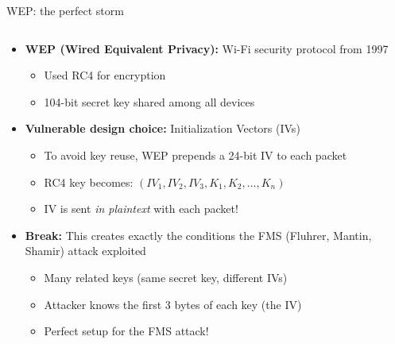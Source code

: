 \documentclass[aspectratio=169, lualatex, handout]{beamer}
\begin{document}
\begin{frame}{WEP: the perfect storm}
	\begin{columns}[c]
		\begin{column}{1\textwidth}
			\begin{itemize}[<+->]
				\item \textbf{WEP (Wired Equivalent Privacy):} Wi-Fi security protocol from 1997
				      \begin{itemize}[<+->]
					      \item Used RC4 for encryption
					      \item 104-bit secret key shared among all devices
				      \end{itemize}
				\item \textbf{Vulnerable design choice:} Initialization Vectors (IVs)
				      \begin{itemize}[<+->]
					      \item To avoid key reuse, WEP prepends a 24-bit IV to each packet
					      \item RC4 key becomes: $(IV_1, IV_2, IV_3, K_1, K_2, \ldots, K_n)$
					      \item IV is sent \emph{in plaintext} with each packet!
				      \end{itemize}
				\item \textbf{Break:} This creates exactly the conditions the FMS (Fluhrer, Mantin, Shamir) attack exploited
				      \begin{itemize}[<+->]
					      \item Many related keys (same secret key, different IVs)
					      \item Attacker knows the first 3 bytes of each key (the IV)
					      \item Perfect setup for the FMS attack!
				      \end{itemize}
			\end{itemize}
		\end{column}
	\end{columns}
\end{frame}
\end{document}
